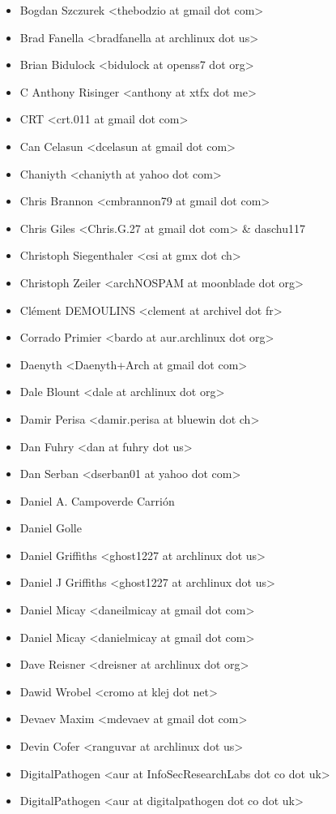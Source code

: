 \begin{itemize}
\item  Bogdan Szczurek <thebodzio at gmail dot com>
\item  Brad Fanella <bradfanella at archlinux dot us>
\item  Brian Bidulock <bidulock at openss7 dot org>
\item  C Anthony Risinger <anthony at xtfx dot me>
\item  CRT <crt.011 at gmail dot com>
\item  Can Celasun <dcelasun at gmail dot com>
\item  Chaniyth <chaniyth at yahoo dot com>
\item  Chris Brannon <cmbrannon79 at gmail dot com>
\item  Chris Giles <Chris.G.27 at gmail dot com> \& daschu117
\item  Christoph Siegenthaler <csi at gmx dot ch>
\item  Christoph Zeiler <archNOSPAM at moonblade dot org>
\item  Clément DEMOULINS <clement at archivel dot fr>
\item  Corrado Primier <bardo at aur.archlinux dot org>
\item  Daenyth <Daenyth+Arch at gmail dot com>
\item  Dale Blount <dale at archlinux dot org>
\item  Damir Perisa <damir.perisa at bluewin dot ch>
\item  Dan Fuhry <dan at fuhry dot us>
\item  Dan Serban <dserban01 at yahoo dot com>
\item  Daniel A. Campoverde Carrión
\item  Daniel Golle
\item  Daniel Griffiths <ghost1227 at archlinux dot us>
\item  Daniel J Griffiths <ghost1227 at archlinux dot us>
\item  Daniel Micay <daneilmicay at gmail dot com>
\item  Daniel Micay <danielmicay at gmail dot com>
\item  Dave Reisner <dreisner at archlinux dot org>
\item  Dawid Wrobel <cromo at klej dot net>
\item  Devaev Maxim <mdevaev at gmail dot com>
\item  Devin Cofer <ranguvar at archlinux dot us>
\item  DigitalPathogen <aur at InfoSecResearchLabs dot co dot uk>
\item  DigitalPathogen <aur at digitalpathogen dot co dot uk>

\end{itemize}
